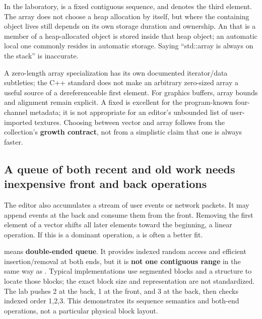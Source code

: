 In the laboratory,  is a fixed contiguous sequence, and  denotes the third element. The array does not choose a heap allocation by itself, but where the containing object lives still depends on its own storage duration and ownership. An  that is a member of a heap-allocated object is stored inside that heap object; an automatic local one commonly resides in automatic storage. Saying ``std::array is always on the stack'' is inaccurate.

A zero-length array specialization has its own documented iterator/data subtleties; the C++ standard does not make an arbitrary zero-sized array a useful source of a dereferenceable first element. For graphics buffers, array bounds and alignment remain explicit. A fixed  is excellent for the program-known four-channel metadata; it is not appropriate for an editor's unbounded list of user-imported textures. Choosing between vector and array follows from the collection's \textbf{growth contract}, not from a simplistic claim that one is always faster.

\subsection{A queue of both recent and old work needs inexpensive front and back operations}\label{01-foundations-i-ch006-a-queue-of-both-recent-and-old-work-needs-inexpensive-front-and-back-operations}

\hypertarget{01-foundations-i-ch006-a-queue-of-both-recent-and-old-work-needs-inexpensive-front-and-back-operations}{}

The editor also accumulates a stream of user events or network packets. It may append events at the back and consume them from the front. Removing the first element of a vector shifts all later elements toward the beginning, a linear operation. If this is a dominant operation, a  is often a better fit.

 means \textbf{double-ended queue}. It provides indexed random access and efficient insertion/removal at both ends, but it is \textbf{not one contiguous  range} in the same way as . Typical implementations use segmented blocks and a structure to locate those blocks; the exact block size and representation are not standardized. The lab pushes 2 at the back, 1 at the front, and 3 at the back, then checks indexed order 1,2,3. This demonstrates its sequence semantics and both-end operations, not a particular physical block layout.

